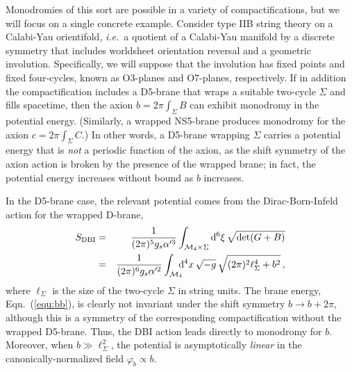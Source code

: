 \documentclass[12pt,letterpaper,rotate]{article}
\def\d{{\rm d}}
\begin{document}
{Monodromies of this sort are possible in a variety of compactifications, but we will focus on a single concrete example.  Consider
type IIB string theory on a Calabi-Yau orientifold, {\it i.e.}~a quotient of a Calabi-Yau manifold by a discrete symmetry that includes worldsheet orientation reversal and a geometric involution.  Specifically, we will suppose that the involution has fixed points and fixed four-cycles, known as O3-planes and O7-planes, respectively.  If in addition the compactification includes a D5-brane that wraps a suitable two-cycle $\Sigma$ and fills spacetime, then the axion $b=2\pi \int_{\Sigma}B$ can exhibit monodromy in the potential energy.  (Similarly, a wrapped NS5-brane
produces monodromy for the axion $c=2\pi \int_{\Sigma}C$.)
In other words, a D5-brane wrapping $\Sigma$ carries a potential energy that is {\it not} a periodic function of the axion,
as the shift symmetry of the axion action is broken by the presence of the wrapped brane; in fact, the potential energy increases without bound as $b$ increases.

In the D5-brane case, the relevant potential comes from the Dirac-Born-Infeld action for the wrapped D-brane,
\begin{eqnarray}
S_{\rm DBI} &=& \frac{1}{(2\pi)^5 g_s \alpha'^3} \int_{{\cal M}_4 \times \Sigma}  \d^6 \xi \, \sqrt{\det(G+B)} \\
&=& \frac{1}{(2\pi)^6 g_s \alpha'^2} \int_{{\cal M}_4} \hskip -6pt \d^4 x\, \sqrt{-g} \, \sqrt{(2\pi)^2\ell_\Sigma^4 + b^2} \label{equ:bb}\, ,
\end{eqnarray}
where $\ell_\Sigma$ is the size of the two-cycle $\Sigma$ in string units.
The brane energy, Eqn.~(\ref{equ:bb}), is clearly not invariant under the shift symmetry $b\to b +2\pi$, although this is a symmetry of the corresponding compactification without the wrapped D5-brane.  Thus, the DBI action leads directly to monodromy for $b$.  Moreover, when $b \gg \ell_\Sigma^2$, the potential is asymptotically {\it{linear}} in the canonically-normalized field $\varphi_b \propto b$.

}
\end{document}
